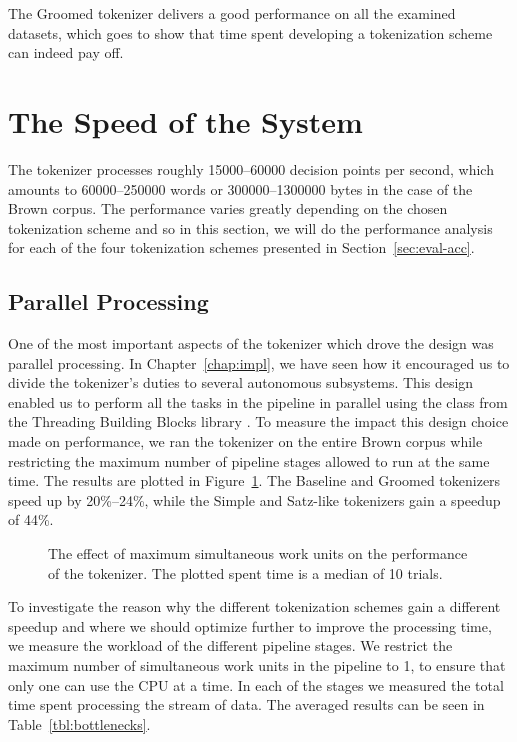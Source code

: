 The Groomed tokenizer delivers a good performance on all the examined datasets,
which goes to show that time spent developing a tokenization scheme can indeed
pay off.

\section{The Speed of the System}
\label{sec:eval-spd}

The tokenizer processes roughly 15000--60000 decision points per second, which
amounts to 60000--250000 words or 300000--1300000 bytes in the case of the
Brown corpus. The performance varies greatly depending on the chosen
tokenization scheme and so in this section, we will do the performance analysis
for each of the four tokenization schemes presented in
Section~\ref{sec:eval-acc}.

\subsection{Parallel Processing}
\label{ssec:eval-spd-parallel}

One of the most important aspects of the tokenizer which drove the design was
parallel processing. In Chapter~\ref{chap:impl}, we have seen how it encouraged
us to divide the tokenizer's duties to several autonomous subsystems. This
design enabled us to perform all the tasks in the pipeline in parallel using
the  class from the Threading Building Blocks library
\cite{web-tbb}. To measure the impact this design choice made on performance,
we ran the tokenizer on the entire Brown corpus while restricting the maximum
number of pipeline stages allowed to run at the same time. The results are
plotted in Figure~\ref{fig:plot-work-units}. The Baseline and Groomed
tokenizers speed up by 20\%--24\%, while the Simple and Satz-like tokenizers
gain a speedup of 44\%.

\begin{figure}
  \begin{center}
    
    \caption{The effect of maximum simultaneous work units on the performance of
             the tokenizer. The plotted spent time is a median of 10 trials.}
    \label{fig:plot-work-units}
  \end{center}
\end{figure}

To investigate the reason why the different tokenization schemes gain a
different speedup and where we should optimize further to improve the
processing time, we measure the workload of the different pipeline stages. We
restrict the maximum number of simultaneous work units in the pipeline to 1, to
ensure that only one can use the CPU at a time. In each of the stages we
measured the total time spent processing the stream of data. The averaged
results can be seen in Table~\ref{tbl:bottlenecks}.

